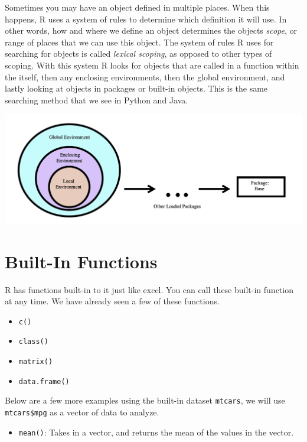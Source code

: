 \documentclass[
]{book}
\providecommand{\tightlist}{%
  \setlength{\itemsep}{0pt}\setlength{\parskip}{0pt}}
\begin{document}
Sometimes you may have an object defined in multiple places. When this happens, R uses a system of rules to determine which definition it will use. In other words, how and where we define an object determines the objects \emph{scope}, or range of places that we can use this object. The system of rules R uses for searching for objects is called \emph{lexical scoping}, as opposed to other types of scoping. With this system R looks for objects that are called in a function within the itself, then any enclosing environments, then the global environment, and lastly looking at objects in packages or built-in objects. This is the same searching method that we see in Python and Java.

\begin{center}\includegraphics[width=36.5in]{images/Scoping} \end{center}

\hypertarget{built-in-functions}{%
\section{Built-In Functions}\label{built-in-functions}}

R has functions built-in to it just like excel. You can call these built-in function at any time. We have already seen a few of these functions.

\begin{itemize}
\tightlist
\item
  \texttt{c()}
\item
  \texttt{class()}
\item
  \texttt{matrix()}
\item
  \texttt{data.frame()}
\end{itemize}

Below are a few more examples using the built-in dataset \texttt{mtcars}, we will use \texttt{mtcars\$mpg} as a vector of data to analyze.

\begin{itemize}
\tightlist
\item
  \texttt{mean()}: Takes in a vector, and returns the mean of the values in the vector.
\end{itemize}
\end{document}
